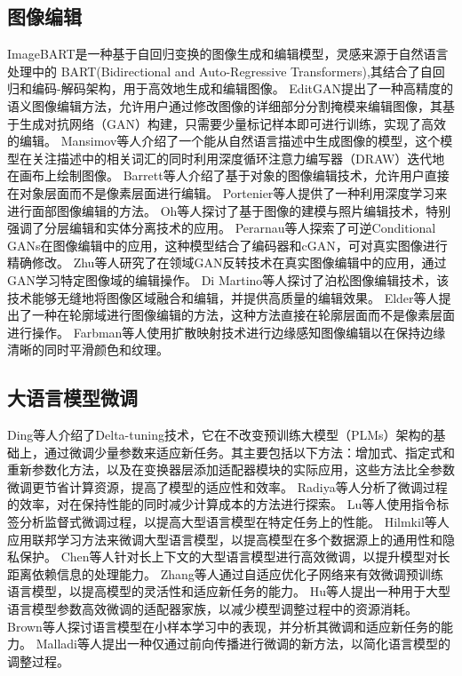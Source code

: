 \documentclass[a4paper,AutoFakeBold,oneside,12pt]{book}
\begin{document}
\subsection{图像编辑}
ImageBART\cite{esser2021imagebart}是一种基于自回归变换的图像生成和编辑模型，灵感来源于自然语言处理中的 BART(Bidirectional and Auto-Regressive Transformers)\cite{lewis2019bart},其结合了自回归和编码-解码架构，用于高效地生成和编辑图像。
EditGAN\cite{ling2021editgan}提出了一种高精度的语义图像编辑方法，允许用户通过修改图像的详细部分分割掩模来编辑图像，其基于生成对抗网络（GAN）构建，只需要少量标记样本即可进行训练，实现了高效的编辑。
Mansimov等人\cite{mansimov2015generating}介绍了一个能从自然语言描述中生成图像的模型，这个模型在关注描述中的相关词汇的同时利用深度循环注意力编写器（DRAW）迭代地在画布上绘制图像。
Barrett等人\cite{barrett2002object}介绍了基于对象的图像编辑技术，允许用户直接在对象层面而不是像素层面进行编辑。
Portenier等人\cite{portenier2018faceshop}提供了一种利用深度学习来进行面部图像编辑的方法。
Oh等人\cite{oh2001image}探讨了基于图像的建模与照片编辑技术，特别强调了分层编辑和实体分离技术的应用。
Perarnau等人\cite{perarnau2016invertible}探索了可逆Conditional GANs在图像编辑中的应用，这种模型结合了编码器和cGAN，可对真实图像进行精确修改。
Zhu等人\cite{zhu2020domain}研究了在领域GAN反转技术在真实图像编辑中的应用，通过GAN学习特定图像域的编辑操作。
Di Martino等人\cite{di2016poisson}探讨了泊松图像编辑技术，该技术能够无缝地将图像区域融合和编辑，并提供高质量的编辑效果。
Elder等人\cite{elder1998image}提出了一种在轮廓域进行图像编辑的方法，这种方法直接在轮廓层面而不是像素层面进行操作。
Farbman等人\cite{farbman2010diffusion}使用扩散映射技术进行边缘感知图像编辑以在保持边缘清晰的同时平滑颜色和纹理。
\subsection{大语言模型微调}
Ding等人\cite{ding2023parameter}介绍了Delta-tuning技术，它在不改变预训练大模型（PLMs）架构的基础上，通过微调少量参数来适应新任务。其主要包括以下方法：增加式、指定式和重新参数化方法，以及在变换器层添加适配器模块的实际应用，这些方法比全参数微调更节省计算资源，提高了模型的适应性和效率。
Radiya等人\cite{radiya2020fine}分析了微调过程的效率，对在保持性能的同时减少计算成本的方法进行探索。
Lu等人\cite{lu2023instag}使用指令标签分析监督式微调过程，以提高大型语言模型在特定任务上的性能。
Hilmkil等人\cite{hilmkil2021scaling}应用联邦学习方法来微调大型语言模型，以提高模型在多个数据源上的通用性和隐私保护。
Chen等人\cite{chen2023longlora}针对长上下文的大型语言模型进行高效微调，以提升模型对长距离依赖信息的处理能力。
Zhang等人\cite{zhang2022fine}通过自适应优化子网络来有效微调预训练语言模型，以提高模型的灵活性和适应新任务的能力。
Hu等人\cite{hu2023llm}提出一种用于大型语言模型参数高效微调的适配器家族，以减少模型调整过程中的资源消耗。
Brown等人\cite{brown2020language}探讨语言模型在小样本学习中的表现，并分析其微调和适应新任务的能力。
Malladi等人\cite{malladi2024fine}提出一种仅通过前向传播进行微调的新方法，以简化语言模型的调整过程。
\end{document}
